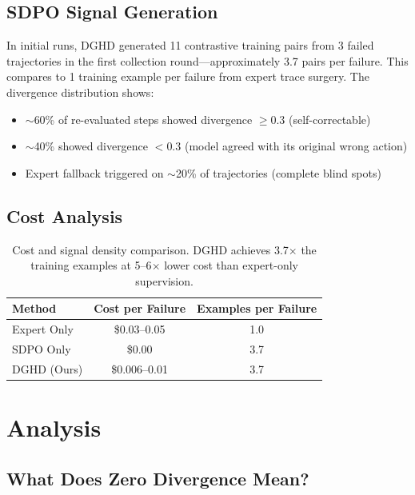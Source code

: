 \documentclass[11pt]{article}
\newcommand{\ours}{DGHD}
\begin{document}
\subsection{SDPO Signal Generation}

In initial runs, \ours{} generated 11 contrastive training pairs from 3 failed trajectories in the first collection round---approximately 3.7 pairs per failure. This compares to 1 training example per failure from expert trace surgery. The divergence distribution shows:

\begin{itemize}
    \item $\sim$60\% of re-evaluated steps showed divergence $\geq 0.3$ (self-correctable)
    \item $\sim$40\% showed divergence $< 0.3$ (model agreed with its original wrong action)
    \item Expert fallback triggered on $\sim$20\% of trajectories (complete blind spots)
\end{itemize}

\subsection{Cost Analysis}

\begin{table}[h]
\centering
\begin{tabular}{lcc}
\toprule
\textbf{Method} & \textbf{Cost per Failure} & \textbf{Examples per Failure} \\
\midrule
Expert Only & \$0.03--0.05 & 1.0 \\
SDPO Only & \$0.00 & 3.7 \\
\ours{} (Ours) & \$0.006--0.01 & 3.7 \\
\bottomrule
\end{tabular}
\caption{Cost and signal density comparison. \ours{} achieves 3.7$\times$ the training examples at 5--6$\times$ lower cost than expert-only supervision.}
\label{tab:cost}
\end{table}

\section{Analysis}
\label{sec:analysis}

\subsection{What Does Zero Divergence Mean?}
\end{document}

